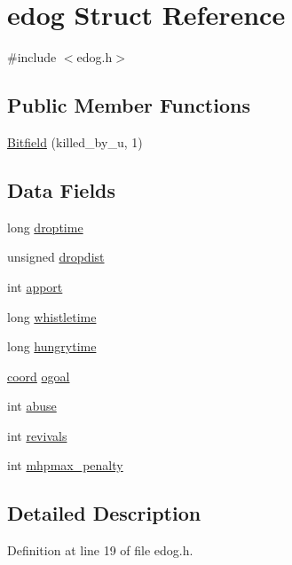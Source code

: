 \hypertarget{structedog}{\section{edog Struct Reference}
\label{structedog}
}


{\ttfamily \#include $<$edog.\+h$>$}

\subsection*{Public Member Functions}
\begin{DoxyCompactItemize}
\item 
\hyperlink{structedog_af6aef72c2f119d625f08230a2b6266b4}{Bitfield} (killed\+\_\+by\+\_\+u, 1)
\end{DoxyCompactItemize}
\subsection*{Data Fields}
\begin{DoxyCompactItemize}
\item 
long \hyperlink{structedog_a3661b488f324c0f7556262ca40a7d10e}{droptime}
\item 
unsigned \hyperlink{structedog_aed5341590189c9fce6bb0c4356f3548f}{dropdist}
\item 
int \hyperlink{structedog_a4c8485a485abc53a7ba4ccba617ab046}{apport}
\item 
long \hyperlink{structedog_a5c6ebe338ea4ab9c7cdf06b34de4bbf6}{whistletime}
\item 
long \hyperlink{structedog_ae93e5b475d6c1c0fb7f97d1c51d97726}{hungrytime}
\item 
\hyperlink{structcoord}{coord} \hyperlink{structedog_af1ac4712c75eb32748f966a880837e4e}{ogoal}
\item 
int \hyperlink{structedog_a1b5a7dc067281ea5f1a380b267aa33cb}{abuse}
\item 
int \hyperlink{structedog_a1c7345aeb0c478b1ff79bead006e8d4e}{revivals}
\item 
int \hyperlink{structedog_a1bb0f59467f6292aad50913ab316a5e4}{mhpmax\+\_\+penalty}
\end{DoxyCompactItemize}


\subsection{Detailed Description}


Definition at line 19 of file edog.\+h.



